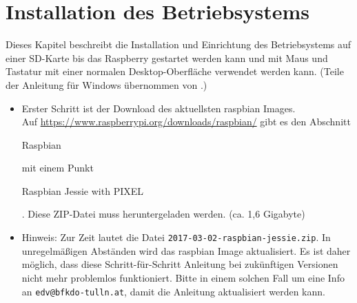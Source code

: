 \label{sec:schritte}

\section{Installation des Betriebsystems}
\label{sec:stepsinstall}
Dieses Kapitel beschreibt die Installation und Einrichtung des Betriebsystems auf einer SD-Karte bis das Raspberry gestartet werden kann und mit Maus und Tastatur mit einer normalen Desktop-Oberfläche verwendet werden kann. (Teile der Anleitung für Windows übernommen von \cite{install}.)

\begin{itemize}

	\item {Erster Schritt ist der Download des aktuellsten raspbian Images.\\
		Auf \url{https://www.raspberrypi.org/downloads/raspbian/} gibt es den Abschnitt \begin{em}Raspbian\end{em} mit einem Punkt \begin{em}Raspbian Jessie with PIXEL\end{em}. 
		Diese ZIP-Datei muss heruntergeladen werden.
		(ca. 1,6 Gigabyte)
		}
	\item {Hinweis: Zur Zeit lautet die Datei \lstinline|2017-03-02-raspbian-jessie.zip|.
		In unregelmäßigen Abständen wird das raspbian Image aktualisiert.
		Es ist daher möglich, dass diese Schritt-für-Schritt Anleitung bei zukünftigen Versionen nicht mehr problemlos funktioniert.
		Bitte in einem solchen Fall um eine Info an \verb|edv@bfkdo-tulln.at|, damit die Anleitung aktualisiert werden kann.\\
}
\end{itemize}
